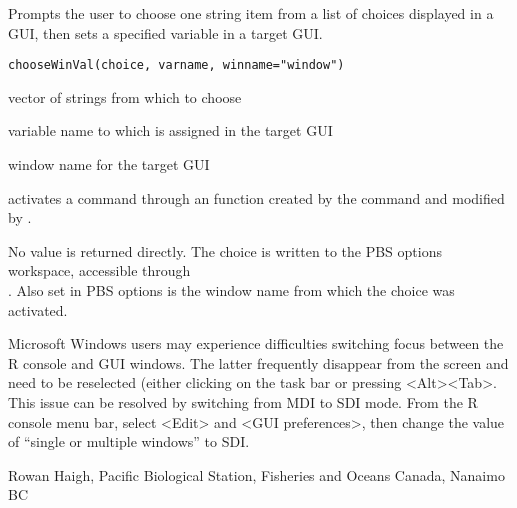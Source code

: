 \documentclass[letterpaper]{book}
\begin{document}
%
\begin{Description}\relax
Prompts the user to choose one string item from a list of 
choices displayed in a GUI, then sets a specified variable in 
a target GUI.
\end{Description}
%
\begin{Usage}
\begin{verbatim}
chooseWinVal(choice, varname, winname="window")
\end{verbatim}
\end{Usage}
%
\begin{Arguments}
\begin{ldescription}
\item[\code{choice}]  vector of strings from which to choose 
\item[\code{varname}]  variable name to which  is assigned in the target GUI 
\item[\code{winname}]  window name for the target GUI 
\end{ldescription}
\end{Arguments}
%
\begin{Details}\relax
{} activates a  command through an
 function created by the  command and 
modified by .
\end{Details}
%
\begin{Value}
No value is returned directly. The choice is written to the PBS options 
workspace, accessible through \\{} . Also set 
in PBS options is the window name from which the choice was activated.
\end{Value}
%
\begin{Note}\relax
 
Microsoft Windows users may experience difficulties switching focus between the 
R console and GUI windows. The latter frequently disappear from the screen and 
need to be reselected (either clicking on the task bar or pressing <Alt><Tab>. 
This issue can be resolved by switching from MDI to SDI mode. From the R console 
menu bar, select <Edit> and <GUI preferences>, then change the value of 
``single or multiple windows'' to SDI.
\end{Note}
%
\begin{Author}\relax
Rowan Haigh, Pacific Biological Station, Fisheries and Oceans Canada, Nanaimo BC
\end{Author}
\end{document}
